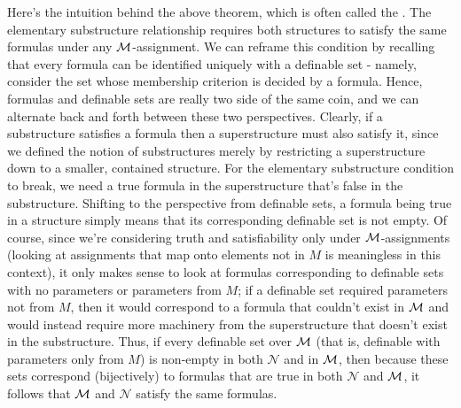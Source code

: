 \documentclass{article}
\begin{document}
Here's the intuition behind the above theorem, which is often called the . The elementary substructure relationship requires both structures to satisfy the same formulas under any $ \mathcal{M} $-assignment. We can reframe this condition by recalling that every formula can be identified uniquely with a definable set - namely, consider the set whose membership criterion is decided by a formula. Hence, formulas and definable sets are really two side of the same coin, and we can alternate back and forth between these two perspectives. Clearly, if a substructure satisfies a formula then a superstructure must also satisfy it, since we defined the notion of substructures merely by restricting a superstructure down to a smaller, contained structure. For the elementary substructure condition to break, we need a true formula in the superstructure that's false in the substructure. Shifting to the perspective from definable sets, a formula being true in a structure simply means that its corresponding definable set is not empty. Of course, since we're considering truth and satisfiability only under $ \mathcal{M} $-assignments (looking at assignments that map onto elements not in $ M $ is meaningless in this context), it only makes sense to look at formulas corresponding to definable sets with no parameters or parameters from $ M $; if a definable set required parameters not from $ M $, then it would correspond to a formula that couldn't exist in $ \mathcal{M} $ and would instead require more machinery from the superstructure that doesn't exist in the substructure. Thus, if every definable set over $ \mathcal{M} $ (that is, definable with parameters only from $ M $) is non-empty in both $ \mathcal{N} $ and in $ \mathcal{M} $, then because these sets correspond (bijectively) to formulas that are true in both $ \mathcal{N} $ and $ \mathcal{M} $, it follows that $ \mathcal{M} $ and $ \mathcal{N} $ satisfy the same formulas.
\end{document}
